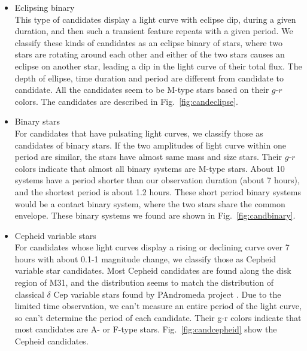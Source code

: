 \documentclass[iop, apj]{emulateapj}
\newcommand{\?}{\stackrel{?}{=}}
\begin{document}
\begin{itemize}
	\item Eclipsing binary\\
	This type of candidates display a light curve with eclipse dip, during a given  duration, and then such a transient feature repeats with a given period. 
	We classify these kinds of candidates as an eclipse binary of stars, where two stars are rotating around each other and either of the two stars causes an eclipse on another star, leading a dip in the light curve of their total flux. The depth of ellipse, time duration and period are different from candidate to candidate. 
	All the candidates seem to be M-type stars based on their $g$-$r$ colors. 
	The candidates are described in Fig.~\ref{fig:candeclipse}. 

	\item Binary stars\\
	For candidates that have pulsating light curves, we classify those as candidates of binary stars. 
	If the two amplitudes of light curve within one period are similar,  the stars have almost same mass and size stars. Their $g$-$r$ colors indicate that almost all binary systems are M-type stars. 
	About 10 systems have a period shorter than our observation duration (about 7 hours), and the shortest period is about 1.2 hours. These short period binary systems would be a contact binary system, where the two stars share the common envelope. 
	These binary systems we found are shown in Fig.~\ref{fig:candbinary}. 
	
	\item Cepheid variable stars\\
	For candidates whose light curves display a rising or declining curve over 7 hours with about 0.1-1 magnitude change, we classify those as Cepheid variable star candidates. 
	Most Cepheid candidates are found along the disk region of M31, and the distribution seems to match the distribution of classical $\delta$ Cep variable stars found by PAndromeda project \citep{Kodricetal:13}. Due to the limited time observation, we can't measure an entire period of the light curve, so can't determine the period of each candidate. 
	Their g-r colors indicate that most candidates are A- or F-type stars. 
	Fig.~\ref{fig:candcepheid} show the Cepheid candidates. 
	

\end{itemize}
\end{document}
